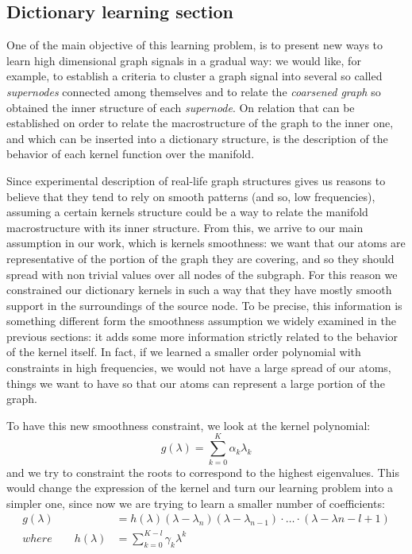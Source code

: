 \subsection{Dictionary learning section}
One of the main objective of this learning problem, is to present new ways to learn high dimensional graph signals in a gradual way: we would like, for example, to establish a criteria to cluster a graph signal into several so called \textit{supernodes} connected among themselves and to relate the \textit{coarsened graph} so obtained the inner structure of each \textit{supernode}. On relation that can be established on order to relate the macrostructure of the graph to the inner one, and which can be inserted into a dictionary structure, is the description of the behavior of each kernel function over the manifold.

Since experimental description of real-life graph structures gives us reasons to believe that they tend to rely on smooth patterns (and so, low frequencies), assuming a certain kernels structure could be a way to relate the manifold macrostructure with its inner structure. From this, we arrive to our main assumption in our work, which is kernels smoothness: we want that our atoms are representative of the portion of the graph they are covering, and so they should spread with non trivial values over all nodes of the subgraph. For this reason we constrained our dictionary kernels in such a way that they have mostly smooth support in the surroundings of the source node. To  be precise, this information is something different form the smoothness assumption we widely examined in the previous sections: it adds some more information strictly related to the behavior of the kernel itself. In fact, if we learned a smaller order polynomial with constraints in high frequencies, we would not have a large spread of our atoms, things we want to have so that our atoms can represent a large portion of the graph.

To have this new smoothness constraint, we look at the kernel polynomial:
\begin{equation}
g(\lambda) = \sum_{k=0}^{K}\alpha_k \lambda_k
\end{equation}
and we try to constraint the roots to correspond to the highest eigenvalues. This would change the expression of the kernel and turn our learning problem into a simpler one, since now we are trying to learn a smaller number of coefficients:
\begin{align}
g(\lambda) &= h(\lambda)(\lambda - \lambda_n)(\lambda - \lambda_{n-1})\cdot \dots \cdot (\lambda - \lambda{n-l+1})\\
where \qquad h(\lambda) &= \sum_{k=0}^{K-l}\gamma_k\lambda^{k}
\label{eq:polynom}
\end{align}

